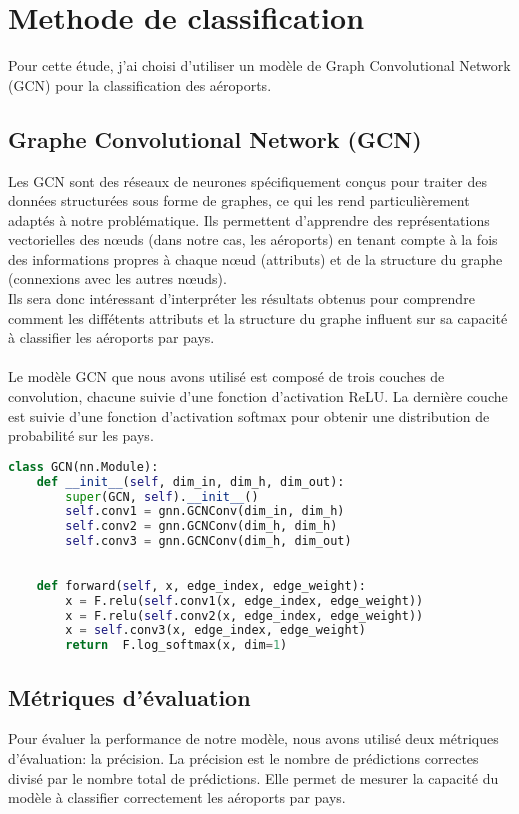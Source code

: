 \section{Methode de classification}
Pour cette étude, j'ai choisi d'utiliser un modèle de Graph Convolutional Network (GCN) pour la classification des aéroports. 

\subsection{Graphe Convolutional Network (GCN)} 
Les GCN sont des réseaux de neurones spécifiquement conçus pour traiter des données structurées sous forme de graphes,  ce qui les rend particulièrement adaptés à notre problématique.  
Ils permettent d'apprendre des représentations vectorielles des nœuds (dans notre cas, les aéroports) en tenant compte à la fois des informations propres à chaque nœud (attributs) et de la structure du graphe (connexions avec les autres nœuds).\\
Ils sera donc intéressant d'interpréter les résultats obtenus pour comprendre comment les diffétents attributs et la structure du graphe influent sur sa capacité à classifier les aéroports par pays.\\
\\
Le modèle GCN que nous avons utilisé est composé de trois couches de convolution, chacune suivie d'une fonction d'activation ReLU. La dernière couche est suivie d'une fonction d'activation softmax
pour obtenir une distribution de probabilité sur les pays.\\
\begin{lstlisting}[language=Python]
class GCN(nn.Module):
    def __init__(self, dim_in, dim_h, dim_out):
        super(GCN, self).__init__()
        self.conv1 = gnn.GCNConv(dim_in, dim_h)
        self.conv2 = gnn.GCNConv(dim_h, dim_h)
        self.conv3 = gnn.GCNConv(dim_h, dim_out)
        
        
    def forward(self, x, edge_index, edge_weight):
        x = F.relu(self.conv1(x, edge_index, edge_weight))
        x = F.relu(self.conv2(x, edge_index, edge_weight))
        x = self.conv3(x, edge_index, edge_weight)
        return  F.log_softmax(x, dim=1)
\end{lstlisting}


\subsection{Métriques d'évaluation}
Pour évaluer la performance de notre modèle, nous avons utilisé deux métriques d'évaluation: la précision. 
La précision est le nombre de prédictions correctes divisé par le nombre total de prédictions. Elle permet de mesurer la capacité du modèle à classifier correctement les aéroports par pays.\\



